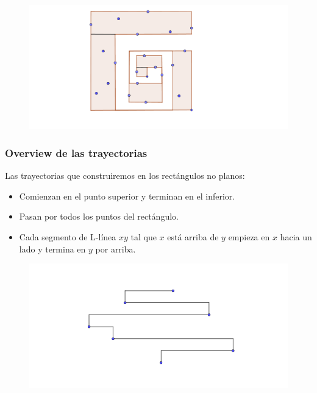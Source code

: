 \documentclass{beamer}
\begin{document}
\begin{frame}
\begin{figure}[h]
\includegraphics[width=\textwidth]{Poligono-con-planos-4}
\end{figure}
\end{frame}
\begin{frame}
\frametitle{Overview de las trayectorias}
Las trayectorias que construiremos en los  rectángulos no planos:

\begin{itemize}
 \item<1-> Comienzan en el punto superior y terminan en el inferior.
 \item<2-> Pasan por todos los puntos del rectángulo.
 \item<3> Cada segmento de  L-línea $xy$ tal que $x$ está arriba de $y$ empieza en $x$ hacia un lado y termina en $y$ por arriba.
\end{itemize}

\end{frame}
\begin{frame}
\begin{figure}[h]
\includegraphics[width=\textwidth]{Trayectoria-monotona}
\end{figure}
\end{frame}
\end{document}
